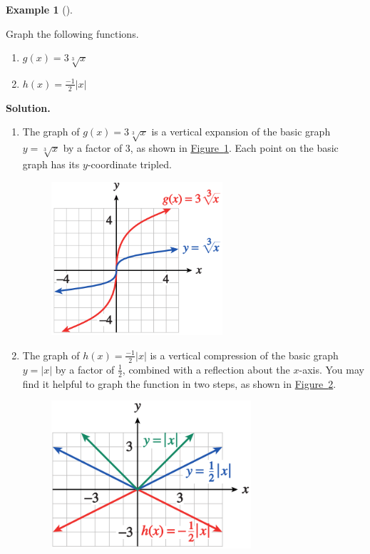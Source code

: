 \documentclass[10pt,]{book}
\theoremstyle{plain}
\theoremstyle{definition}
\theoremstyle{definition}
\newtheorem{example}[theorem]{Example}
\numberwithin{equation}{section}
\newcommand\abs[1]{\left|#1\right|}
\begin{document}
%
\begin{example}[]\label{example-scale}

        Graph the following functions.
        \leavevmode%
\begin{enumerate}[label=*\alph**]
\item\hypertarget{li-311}{}\(g(x) = 3\sqrt[3]{x}\)\item\hypertarget{li-312}{}\(h(x) =\frac{−1}{2}\abs{x}\)\end{enumerate}

\par\medskip\noindent%
\textbf{Solution.}\quad \leavevmode%
\begin{enumerate}[label=*\alph**]
\item\hypertarget{li-313}{}The graph of \(g(x) = 3\sqrt[3]{x}\) is a vertical expansion of the basic graph \(y = \sqrt[3]{x}\) by a factor of \(3\), as shown in \hyperref[fig-scale-cube-root]{Figure~\ref{fig-scale-cube-root}}. Each point on the basic graph has its \(y\)-coordinate tripled.
            \leavevmode%
\begin{figure}
\centering
\includegraphics[width=0.60\textwidth,]{images/fig-scale-cube-root.svg}\caption{\label{fig-scale-cube-root}}
\end{figure}
\item\hypertarget{li-314}{}
            The graph of \(h(x) = \frac{−1}{2}\abs{x}\) is a vertical compression of the basic graph \(y = \abs{x}\) by a factor of \(\frac{1}{2}\), combined with a reflection about the \(x\)-axis. You may find it helpful to graph the function in two steps, as shown in \hyperref[fig-scale-abs]{Figure~\ref{fig-scale-abs}}.
            \leavevmode%
\begin{figure}
\centering
\includegraphics[width=0.70\textwidth,]{images/fig-scale-abs.svg}\caption{\label{fig-scale-abs}}

\end{figure}
\end{enumerate}
\end{example}
\end{document}
